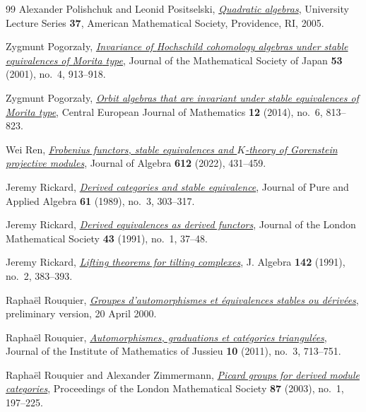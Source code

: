 \documentclass[12pt,a4paper,english,reqno]{amsart}
\numberwithin{equation}{section}
\theoremstyle{plain}
\theoremstyle{definition}
\begin{document}
\begin{thebibliography}{99}
Alexander Polishchuk and Leonid Positselski,
  \emph{\href{https://doi.org/10.1090/ulect/037}{Quadratic algebras}},
  University Lecture Series \textbf{37}, American Mathematical Society,
  Providence, RI, 2005.

Zygmunt Pogorza{\l}y,
  \emph{\href{https://doi.org/10.2969/jmsj/05340913}{Invariance of {Hochschild}
  cohomology algebras under stable equivalences of {Morita} type}}, Journal of
  the Mathematical Society of Japan \textbf{53} (2001), no.~4, 913--918.

Zygmunt Pogorza{\l}y, \emph{\href{https://doi.org/10.2478/s11533-013-0385-7}{Orbit algebras
  that are invariant under stable equivalences of {Morita} type}}, Central
  European Journal of Mathematics \textbf{12} (2014), no.~6, 813--823.

Wei Ren, \emph{\href{https://doi.org/10.1016/j.jalgebra.2022.08.029}{Frobenius
  functors, stable equivalences and {$K$}-theory of {Gorenstein} projective
  modules}}, Journal of Algebra \textbf{612} (2022), 431--459.

Jeremy Rickard,
  \emph{\href{https://doi.org/10.1016/0022-4049(89)90081-9}{Derived categories
  and stable equivalence}}, Journal of Pure and Applied Algebra \textbf{61}
  (1989), no.~3, 303--317.

Jeremy Rickard, \emph{\href{https://doi.org/10.1112/jlms/s2-43.1.37}{Derived
  equivalences as derived functors}}, Journal of the London Mathematical
  Society \textbf{43} (1991), no.~1, 37--48.

Jeremy Rickard, \emph{\href{https://doi.org/10.1016/0021-8693(91)90313-W}
  {Lifting theorems for tilting complexes}},
J. Algebra \textbf{142} (1991), no.~2, 383--393.

Rapha{\"e}l Rouquier,
  \emph{\href{https://www.math.ucla.edu/~rouquier/papers/auto.pdf}
  {Groupes d'automorphismes et \'{e}quivalences stables ou d\'{e}riv\'{e}es}},
  preliminary version, 20 April 2000.

Rapha{\"e}l Rouquier,
  \emph{\href{https://doi.org/10.1017/S1474748011000089}{Automorphismes,
  graduations et cat{\'e}gories triangul{\'e}es}}, Journal of the Institute of
  Mathematics of Jussieu \textbf{10} (2011), no.~3, 713--751.

Rapha{\"e}l Rouquier and Alexander Zimmermann,
  \emph{\href{https://doi.org/10.1112/S0024611503014059}{Picard groups for
  derived module categories}}, Proceedings of the London Mathematical Society
  \textbf{87} (2003), no.~1, 197--225.


\end{thebibliography}
\end{document}
